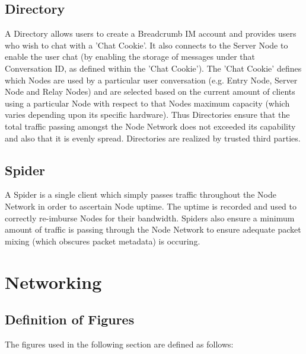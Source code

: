 \documentclass{article}
\begin{document}
\subsection{Directory}
A Directory allows users to create a Breadcrumb IM account and provides users who wish to chat with a 'Chat Cookie'. It also connects to the Server Node to enable the user chat (by enabling 
the storage of messages under that Conversation ID, as defined within the 'Chat Cookie'). The 'Chat Cookie' defines which Nodes are used by a particular user conversation (e.g. Entry Node, Server Node and Relay Nodes) and are
selected based on the current amount of clients using a particular Node with respect to that Nodes maximum capacity (which varies depending upon its specific hardware). Thus
Directories ensure that the total traffic passing amongst the Node Network does not exceeded its capability and also that it is evenly spread.
Directories are realized by trusted third parties.

\subsection{Spider}
A Spider is a single client which simply passes traffic throughout the Node Network in order to ascertain Node uptime. The uptime is recorded and used to correctly re-imburse
Nodes for their bandwidth. Spiders also ensure a minimum amount of traffic is passing through the Node Network to ensure adequate packet mixing (which obscures packet metadata)
is occuring.

\newpage

\section{Networking}
\subsection{Definition of Figures}
The figures used in the following section are defined as follows:
\end{document}
